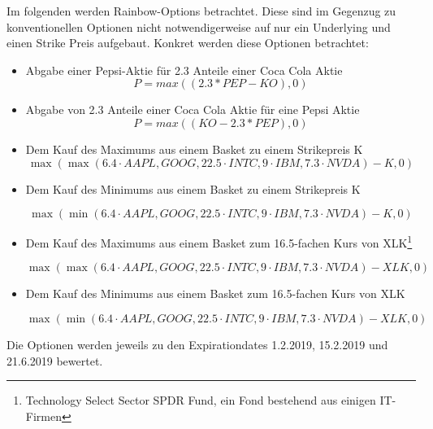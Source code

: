 \documentclass[12pt]{article}
\begin{document}
Im folgenden werden Rainbow-Options betrachtet. Diese sind im Gegenzug zu konventionellen Optionen nicht notwendigerweise auf nur ein Underlying und einen Strike Preis aufgebaut.
\newline
Konkret werden diese Optionen betrachtet:
\begin{itemize}
	\item Abgabe einer Pepsi-Aktie für 2.3 Anteile einer Coca Cola Aktie
		\begin{equation*}
	P=max((2.3*PEP-KO),0)
	\end{equation*}	
	\item Abgabe von 2.3 Anteile einer Coca Cola Aktie für eine Pepsi Aktie
	\begin{equation*}
	P=max((KO-2.3*PEP),0)
	\end{equation*}	
	\item Dem Kauf des Maximums aus einem Basket zu einem Strikepreis K
	\begin{equation*}
	\max(\max(6.4 \cdot AAPL,GOOG,22.5 \cdot INTC, 9 \cdot IBM, 7.3 \cdot NVDA)-K,0)
	\end{equation*}
	\item Dem Kauf des Minimums aus einem Basket zu einem Strikepreis K
	
	\begin{equation*}
	\max(\min(6.4 \cdot AAPL,GOOG,22.5 \cdot INTC, 9 \cdot IBM, 7.3 \cdot NVDA)-K,0)
	\end{equation*}
	\item Dem Kauf des Maximums aus einem Basket zum 16.5-fachen Kurs von XLK\footnote{Technology Select Sector SPDR Fund, ein Fond bestehend aus einigen IT-Firmen}
	
	\begin{equation*}
	\max(\max(6.4 \cdot AAPL,GOOG,22.5 \cdot INTC, 9 \cdot IBM, 7.3 \cdot NVDA)-XLK,0)
	\end{equation*}
	\item Dem Kauf des Minimums aus einem Basket zum 16.5-fachen Kurs von XLK
	
	\begin{equation*}
	\max(\min(6.4 \cdot AAPL,GOOG,22.5 \cdot INTC, 9 \cdot IBM, 7.3 \cdot NVDA)-XLK,0)
	\end{equation*}
	

\end{itemize}

Die Optionen werden jeweils zu den Expirationdates 1.2.2019, 15.2.2019 und 21.6.2019 bewertet.
\end{document}
